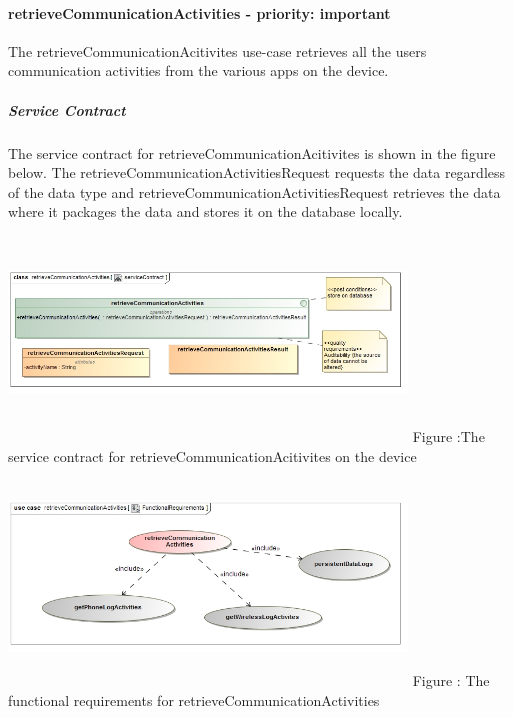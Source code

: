 \documentclass[hidelinks, 12pt, oneside]{article}
\begin{document}
		\paragraph{retrieveCommunicationActivities - priority: important}
		The retrieveCommunicationAcitivites use-case retrieves all the users communication activities from 		the various apps on the device.\newline
		\subparagraph{Service Contract}
		The service contract for retrieveCommunicationAcitivites is shown in the figure below. The 					retrieveCommunicationActivitiesRequest requests the data regardless of the data type and 		retrieveCommunicationActivitiesRequest retrieves the data where it packages the data and stores it on the database locally.\newline\newline	
	\includegraphics[width=400px,height=220px]{img/serviceContractRetrieveCommunicationActivities.jpg}
		Figure :The service contract for retrieveCommunicationAcitivites on the device\newline
	\includegraphics[width=400px,height=220px]{img/functionalRequirementsRetrieveCommunicationActivities.jpg}
		Figure : The functional requirements for retrieveCommunicationActivities\newline
		
			
\end{document}

